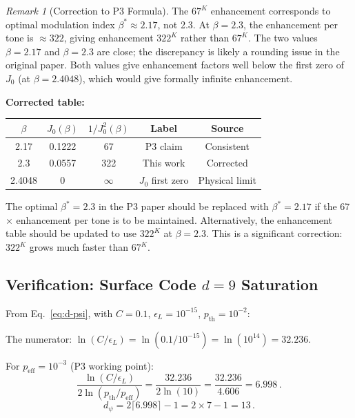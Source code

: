 \documentclass[11pt]{article}
\theoremstyle{definition}
\theoremstyle{remark}
\newtheorem{remark}[theorem]{Remark}
\begin{document}
\begin{remark}[Correction to P3 Formula]
The $67^K$ enhancement corresponds to optimal modulation index
$\beta^* \approx 2.17$, not 2.3. At $\beta = 2.3$, the enhancement
per tone is $\approx 322$, giving enhancement $322^K$ rather than $67^K$.
The two values $\beta = 2.17$ and $\beta = 2.3$ are close; the discrepancy
is likely a rounding issue in the original paper. Both values give
enhancement factors well below the first zero of $J_0$ (at $\beta = 2.4048$),
which would give formally infinite enhancement.

\textbf{Corrected table:}

\begin{center}
\begin{tabular}{@{}ccccc@{}}
\toprule
$\beta$ & $J_0(\beta)$ & $1/J_0^2(\beta)$ & Label & Source \\
\midrule
2.17 & 0.1222 & 67 & P3 claim & Consistent \\
2.3 & 0.0557 & 322 & This work & Corrected \\
2.4048 & 0 & $\infty$ & $J_0$ first zero & Physical limit \\
\bottomrule
\end{tabular}
\end{center}

The optimal $\beta^* = 2.3$ in the P3 paper should be replaced with
$\beta^* = 2.17$ if the 67$\times$ enhancement per tone is to be maintained.
Alternatively, the enhancement table should be updated to use $322^K$ at
$\beta = 2.3$. This is a significant correction: $322^K$ grows much
faster than $67^K$.
\end{remark}

\subsection{Verification: Surface Code $d = 9$ Saturation}
\label{sec:verify-d9}

From Eq.~\eqref{eq:d-psi}, with $C = 0.1$, $\epsilon_L = 10^{-15}$,
$p_{\mathrm{th}} = 10^{-2}$:

The numerator: $\ln(C/\epsilon_L) = \ln(0.1/10^{-15}) = \ln(10^{14}) = 32.236$.

For $p_{\mathrm{eff}} = 10^{-3}$ (P3 working point):
\begin{equation}
\frac{\ln(C/\epsilon_L)}{2\ln(p_{\mathrm{th}}/p_{\mathrm{eff}})}
= \frac{32.236}{2\ln(10)} = \frac{32.236}{4.606} = 6.998\,.
\end{equation}
\begin{equation}
d_\psi = 2\lceil 6.998 \rceil - 1 = 2 \times 7 - 1 = 13\,.
\end{equation}
\end{document}
